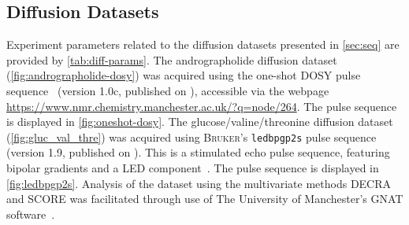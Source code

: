 \subsection{Diffusion Datasets}

Experiment parameters related to the diffusion datasets presented in
\cref{sec:seq} are provided by \cref{tab:diff-params}.
The andrographolide diffusion dataset (\cref{fig:andrographolide-dosy})
was acquired using the one-shot \ac{DOSY} pulse sequence~\cite{Pelta2002}
(version 1.0c, published on ), accessible via the webpage
\url{https://www.nmr.chemistry.manchester.ac.uk/?q=node/264}. The pulse
sequence is displayed in \cref{fig:oneshot-dosy}.
The glucose/valine/threonine diffusion dataset (\cref{fig:gluc_val_thre})
was acquired using \textsc{Bruker}'s \texttt{ledbpgp2s} pulse sequence (version 1.9, published on
). This is a stimulated echo pulse sequence, featuring
bipolar gradients and a \ac{LED} component~\cite{Wu1995}. The pulse sequence is
displayed in \cref{fig:ledbpgp2s}.
Analysis of the dataset using the multivariate methods \ac{DECRA} and
\ac{SCORE} was facilitated through use of The University of Manchester's
\ac{GNAT} software~\cite{Castanar2018}.


